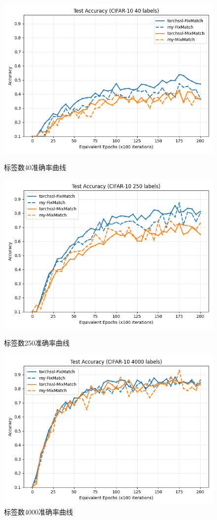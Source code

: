 \documentclass[a4paper, utf8]{ctexart}
\begin{document}
	\begin{figure}[htbp]
		\centering
		\captionsetup{font=small}
		\begin{minipage}{.32\textwidth}
			\centering
			\includegraphics[width=.9\textwidth]{./figure/40acc.png}
			\caption{标签数40准确率曲线}
		\end{minipage}
		\begin{minipage}{.32\textwidth}
			\centering
			\includegraphics[width=.9\textwidth]{./figure/250acc.png}
			\caption{标签数250准确率曲线}
		\end{minipage}
		\begin{minipage}{.32\textwidth}
			\centering
			\includegraphics[width=.9\textwidth]{./figure/4000acc.png}
			\caption{标签数4000准确率曲线}
		\end{minipage}
		

\end{figure}
\end{document}
